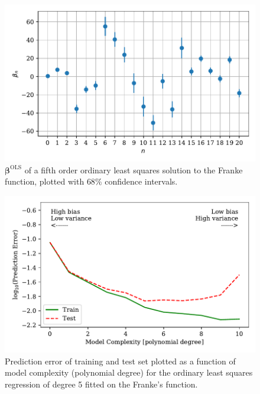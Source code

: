 \documentclass[a4paper, 10pt]{article}
\begin{document}
\begin{figure}[H]
    \includegraphics[scale=1]{figs/beta_variance_ols_Franke.pdf}
    \caption{$\bm{\beta}^{\text{OLS}}$  of a fifth order ordinary least squares solution to the Franke function, plotted with $68\%$ confidence intervals.}
    \label{fig:beta_variance_Franke}
\end{figure}

\begin{figure}[H]
    \includegraphics[scale=1]{figs/biasvariancetradeoff_ols_Franke.pdf}
    \caption{Prediction error of training and test set plotted as a function of model complexity (polynomial degree) for the ordinary least squares regression of degree 5 fitted on the Franke's function.}
    \label{fig:bias_ols_Franke}
\end{figure}
\end{document}
